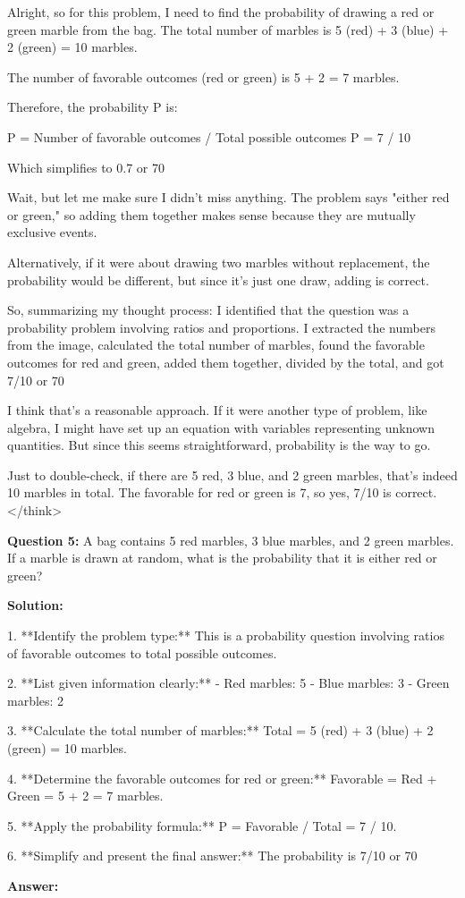 Alright, so for this problem, I need to find the probability of drawing a red or green marble from the bag. The total number of marbles is 5 (red) + 3 (blue) + 2 (green) = 10 marbles.

The number of favorable outcomes (red or green) is 5 + 2 = 7 marbles.

Therefore, the probability P is:

P = Number of favorable outcomes / Total possible outcomes
P = 7 / 10

Which simplifies to 0.7 or 70%

Wait, but let me make sure I didn't miss anything. The problem says "either red or green," so adding them together makes sense because they are mutually exclusive events.

Alternatively, if it were about drawing two marbles without replacement, the probability would be different, but since it's just one draw, adding is correct.

So, summarizing my thought process: I identified that the question was a probability problem involving ratios and proportions. I extracted the numbers from the image, calculated the total number of marbles, found the favorable outcomes for red and green, added them together, divided by the total, and got 7/10 or 70%

I think that's a reasonable approach. If it were another type of problem, like algebra, I might have set up an equation with variables representing unknown quantities. But since this seems straightforward, probability is the way to go.

Just to double-check, if there are 5 red, 3 blue, and 2 green marbles, that's indeed 10 marbles in total. The favorable for red or green is 7, so yes, 7/10 is correct.
</think>

\textbf{Question 5:} A bag contains 5 red marbles, 3 blue marbles, and 2 green marbles. If a marble is drawn at random, what is the probability that it is either red or green?

\textbf{Solution:}

1. **Identify the problem type:** This is a probability question involving ratios of favorable outcomes to total possible outcomes.

2. **List given information clearly:** 
   - Red marbles: 5
   - Blue marbles: 3
   - Green marbles: 2

3. **Calculate the total number of marbles:**
   Total = 5 (red) + 3 (blue) + 2 (green) = 10 marbles.

4. **Determine the favorable outcomes for red or green:**
   Favorable = Red + Green = 5 + 2 = 7 marbles.

5. **Apply the probability formula:**
   P = Favorable / Total = 7 / 10.

6. **Simplify and present the final answer:**
   The probability is 7/10 or 70%

\textbf{Answer:} 